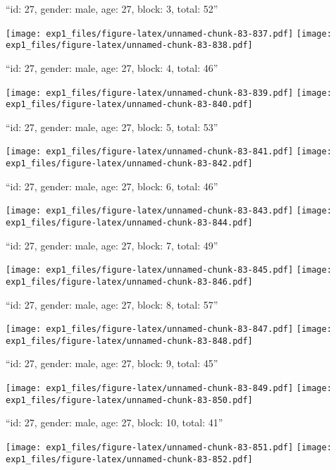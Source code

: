 \documentclass[11pt,,]{article}
\begin{document}
\newpage
[1] 

``id: 27, gender: male, age: 27, block: 3, total: 52''

\texttt{[image: exp1\_files/figure-latex/unnamed-chunk-83-837.pdf]}
\texttt{[image: exp1\_files/figure-latex/unnamed-chunk-83-838.pdf]}

\newpage
[1] 

``id: 27, gender: male, age: 27, block: 4, total: 46''

\texttt{[image: exp1\_files/figure-latex/unnamed-chunk-83-839.pdf]}
\texttt{[image: exp1\_files/figure-latex/unnamed-chunk-83-840.pdf]}

\newpage
[1] 

``id: 27, gender: male, age: 27, block: 5, total: 53''

\texttt{[image: exp1\_files/figure-latex/unnamed-chunk-83-841.pdf]}
\texttt{[image: exp1\_files/figure-latex/unnamed-chunk-83-842.pdf]}

\newpage
[1] 

``id: 27, gender: male, age: 27, block: 6, total: 46''

\texttt{[image: exp1\_files/figure-latex/unnamed-chunk-83-843.pdf]}
\texttt{[image: exp1\_files/figure-latex/unnamed-chunk-83-844.pdf]}

\newpage
[1] 

``id: 27, gender: male, age: 27, block: 7, total: 49''

\texttt{[image: exp1\_files/figure-latex/unnamed-chunk-83-845.pdf]}
\texttt{[image: exp1\_files/figure-latex/unnamed-chunk-83-846.pdf]}

\newpage
[1] 

``id: 27, gender: male, age: 27, block: 8, total: 57''

\texttt{[image: exp1\_files/figure-latex/unnamed-chunk-83-847.pdf]}
\texttt{[image: exp1\_files/figure-latex/unnamed-chunk-83-848.pdf]}

\newpage
[1] 

``id: 27, gender: male, age: 27, block: 9, total: 45''

\texttt{[image: exp1\_files/figure-latex/unnamed-chunk-83-849.pdf]}
\texttt{[image: exp1\_files/figure-latex/unnamed-chunk-83-850.pdf]}

\newpage
[1] 

``id: 27, gender: male, age: 27, block: 10, total: 41''

\texttt{[image: exp1\_files/figure-latex/unnamed-chunk-83-851.pdf]}
\texttt{[image: exp1\_files/figure-latex/unnamed-chunk-83-852.pdf]}
\end{document}
